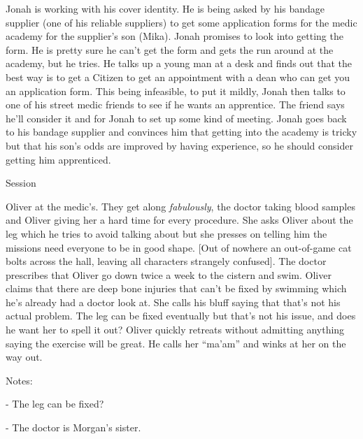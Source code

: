 
Jonah is working with his cover identity.  He is being asked by his bandage supplier (one of his reliable suppliers) to get some application forms for the medic academy for the supplier's son (Mika).  Jonah promises to look into getting the form.  He is pretty sure he can't get the form and gets the run around at the academy, but he tries.  He talks up a young man at a desk and finds out that the best way is to get a Citizen to get an appointment with a dean who can get you an application form.  This being infeasible, to put it mildly, Jonah then talks to one of his street medic friends to see if he wants an apprentice.  The friend says he'll consider it and for Jonah to set up some kind of meeting.  Jonah goes back to his bandage supplier and convinces him that getting into the academy is tricky but that his son's odds are improved by having experience, so he should consider getting him apprenticed.



 {\LARGE Session } 



Oliver at the medic's.  They get along \textit{fabulously}, the doctor taking blood samples and Oliver giving her a hard time for every procedure.  She asks Oliver about the leg which he tries to avoid talking about but she presses on telling him the missions need everyone to be in good shape.  {[}Out of nowhere an out-of-game cat bolts across the hall, leaving all characters strangely confused{]}.  The doctor prescribes that Oliver go down twice a week to the cistern and swim.  Oliver claims that there are deep bone injuries that can't be fixed by swimming which he's already had a doctor look at.  She calls his bluff saying that that's not his actual problem.  The leg can be fixed eventually but that's not his issue, and does he want her to spell it out?  Oliver quickly retreats without admitting anything saying the exercise will be great.  He calls her ``ma'am'' and winks at her on the way out.



Notes:

- The leg can be fixed?

- The doctor is Morgan's sister.



